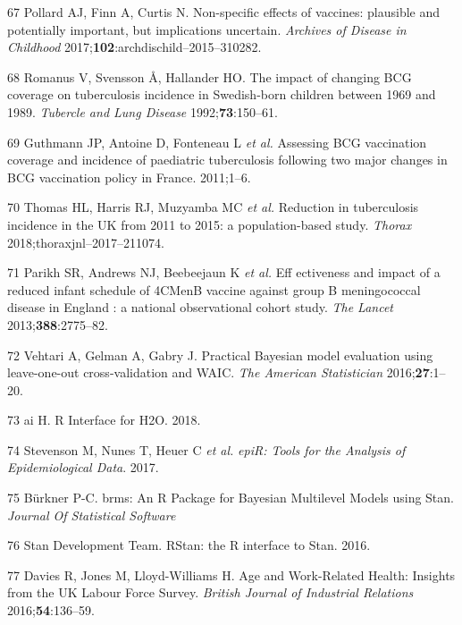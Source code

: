 \documentclass[11pt,twoside]{bristolthesis}
\begin{document}
  \leavevmode\hypertarget{ref-Pollard2017}{}%
  67 Pollard AJ, Finn A, Curtis N. Non-specific effects of vaccines: plausible and potentially important, but implications uncertain. \emph{Archives of Disease in Childhood} 2017;\textbf{102}:archdischild--2015--310282.
  
  \leavevmode\hypertarget{ref-Romanus1992}{}%
  68 Romanus V, Svensson Å, Hallander HO. The impact of changing BCG coverage on tuberculosis incidence in Swedish-born children between 1969 and 1989. \emph{Tubercle and Lung Disease} 1992;\textbf{73}:150--61.
  
  \leavevmode\hypertarget{ref-Guthmann2011}{}%
  69 Guthmann JP, Antoine D, Fonteneau L \emph{et al.} Assessing BCG vaccination coverage and incidence of paediatric tuberculosis following two major changes in BCG vaccination policy in France. 2011;1--6.
  
  \leavevmode\hypertarget{ref-Thomas2018}{}%
  70 Thomas HL, Harris RJ, Muzyamba MC \emph{et al.} Reduction in tuberculosis incidence in the UK from 2011 to 2015: a population-based study. \emph{Thorax} 2018;thoraxjnl--2017--211074.
  
  \leavevmode\hypertarget{ref-Parikh2016a}{}%
  71 Parikh SR, Andrews NJ, Beebeejaun K \emph{et al.} Eff ectiveness and impact of a reduced infant schedule of 4CMenB vaccine against group B meningococcal disease in England : a national observational cohort study. \emph{The Lancet} 2013;\textbf{388}:2775--82.
  
  \leavevmode\hypertarget{ref-Vehtari2016}{}%
  72 Vehtari A, Gelman A, Gabry J. Practical Bayesian model evaluation using leave-one-out cross-validation and WAIC. \emph{The American Statistician} 2016;\textbf{27}:1--20.
  
  \leavevmode\hypertarget{ref-h2o2018}{}%
  73 ai H. R Interface for H2O. 2018.
  
  \leavevmode\hypertarget{ref-EpiR}{}%
  74 Stevenson M, Nunes T, Heuer C \emph{et al.} \emph{epiR: Tools for the Analysis of Epidemiological Data}. 2017.
  
  \leavevmode\hypertarget{ref-Burkner}{}%
  75 Bürkner P-C. brms: An R Package for Bayesian Multilevel Models using Stan. \emph{Journal Of Statistical Software}
  
  \leavevmode\hypertarget{ref-StanDevelopmentTeam2016}{}%
  76 Stan Development Team. RStan: the R interface to Stan. 2016.
  
  \leavevmode\hypertarget{ref-Davies2016a}{}%
  77 Davies R, Jones M, Lloyd-Williams H. Age and Work-Related Health: Insights from the UK Labour Force Survey. \emph{British Journal of Industrial Relations} 2016;\textbf{54}:136--59.
  
\end{document}
